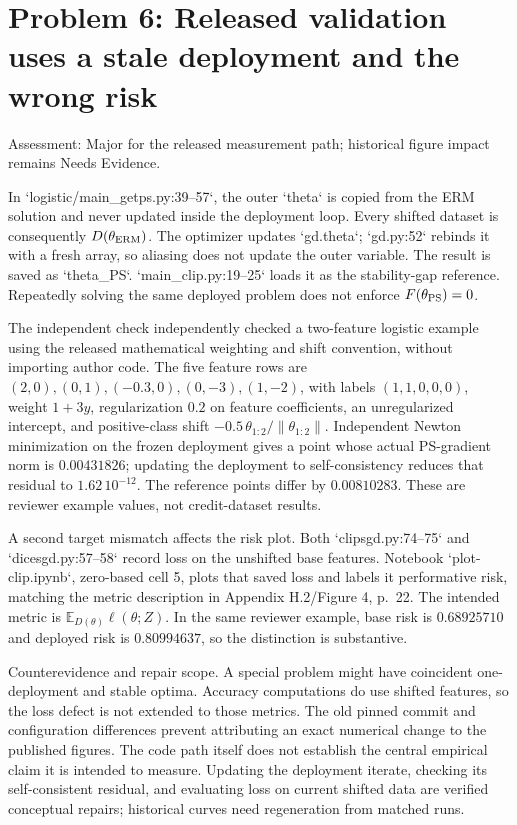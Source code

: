 \documentclass[10pt]{article}
\begin{document}
\section*{Problem 6: Released validation uses a stale deployment and the wrong risk}
Assessment: Major for the released measurement path; historical figure impact remains Needs Evidence.\par
In `logistic/main\_getps.py:39--57`, the outer `theta` is copied from the ERM solution and never updated inside the deployment loop. Every shifted dataset is consequently \(D(\theta_{\rm ERM})\). The optimizer updates `gd.theta`; `gd.py:52` rebinds it with a fresh array, so aliasing does not update the outer variable. The result is saved as `theta\_PS`. `main\_clip.py:19--25` loads it as the stability-gap reference. Repeatedly solving the same deployed problem does not enforce \(F(\theta_{\rm PS})=0\).\par
The independent check independently checked a two-feature logistic example using the released mathematical weighting and shift convention, without importing author code. The five feature rows are \((2,0),(0,1),(-0.3,0),(0,-3),(1,-2)\), with labels \((1,1,0,0,0)\), weight \(1+3y\), regularization \(0.2\) on feature coefficients, an unregularized intercept, and positive-class shift \(-0.5\,\theta_{1:2}/\|\theta_{1:2}\|\). Independent Newton minimization on the frozen deployment gives a point whose actual PS-gradient norm is \(0.00431826\); updating the deployment to self-consistency reduces that residual to \(1.62\,10^{-12}\). The reference points differ by \(0.00810283\). These are reviewer example values, not credit-dataset results.\par
A second target mismatch affects the risk plot. Both `clipsgd.py:74--75` and `dicesgd.py:57--58` record loss on the unshifted base features. Notebook `plot-clip.ipynb`, zero-based cell 5, plots that saved loss and labels it performative risk, matching the metric description in Appendix H.2/Figure 4, p. 22. The intended metric is \(\mathbb E_{D(\theta)}\ell(\theta;Z)\). In the same reviewer example, base risk is \(0.68925710\) and deployed risk is \(0.80994637\), so the distinction is substantive.\par
Counterevidence and repair scope. A special problem might have coincident one-deployment and stable optima. Accuracy computations do use shifted features, so the loss defect is not extended to those metrics. The old pinned commit and configuration differences prevent attributing an exact numerical change to the published figures. The code path itself does not establish the central empirical claim it is intended to measure. Updating the deployment iterate, checking its self-consistent residual, and evaluating loss on current shifted data are verified conceptual repairs; historical curves need regeneration from matched runs.\par
\end{document}
